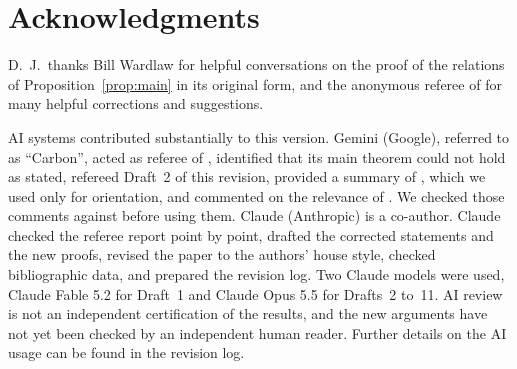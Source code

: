 \documentclass[12pt,letterpaper]{amsart}
\numberwithin{equation}{section}
\theoremstyle{definition}
\theoremstyle{remark}
\begin{document}
\section*{Acknowledgments}

D.~J.\ thanks Bill Wardlaw for helpful conversations on the proof of
the relations of Proposition~\ref{prop:main} in its original form, and
the anonymous referee of \cite{Jo98} for many helpful corrections and
suggestions.

AI systems contributed substantially to this version. Gemini (Google),
referred to as ``Carbon'', acted as referee of \cite{Jo98}, identified
that its main theorem could not hold as stated, refereed Draft~2 of this
revision, provided a summary of \cite{Sa88}, which we used only for
orientation, and commented on the relevance of \cite{Wi22}. We checked
those comments against \cite{Wi22} before using them. Claude
(Anthropic) is a co-author. Claude checked the referee report point by
point, drafted the corrected statements and the new proofs, revised the
paper to the authors' house style, checked bibliographic data, and
prepared the revision log. Two Claude models were used, Claude Fable
5.2 for Draft~1 and Claude Opus 5.5 for Drafts~2 to~11. AI review is not an
independent certification of the results, and the new arguments have
not yet been checked by an independent human reader. Further details on
the AI usage can be found in the revision log.
\end{document}
